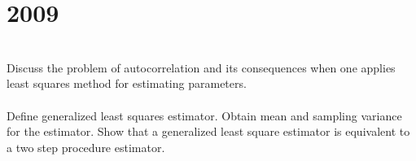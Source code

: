 \section*{2009}
\vspace{-.5cm}
\hrulefill \smallskip\\
 Discuss the problem of autocorrelation and its consequences when one applies least squares method for estimating parameters.
\\\\
 Define generalized least squares estimator. Obtain mean and sampling variance for the estimator. Show that a generalized least square estimator is equivalent to a two step procedure estimator.